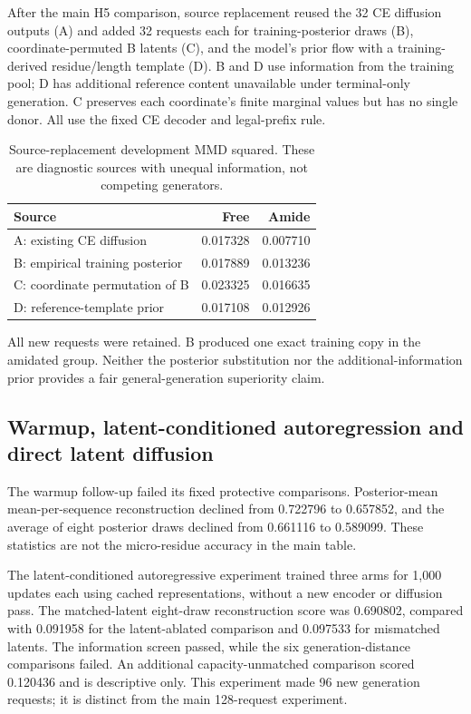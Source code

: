 \documentclass[12pt,a4paper]{article}
\begin{document}
After the main H5 comparison, source replacement reused the 32 CE diffusion outputs (A) and added 32 requests each for training-posterior draws (B), coordinate-permuted B latents (C), and the model's prior flow with a training-derived residue/length template (D). B and D use information from the training pool; D has additional reference content unavailable under terminal-only generation. C preserves each coordinate's finite marginal values but has no single donor. All use the fixed CE decoder and legal-prefix rule.
\begin{table}[htbp]\centering\singlespacing\small
\caption{Source-replacement development MMD squared. These are diagnostic sources with unequal information, not competing generators.}
\begin{tabular}{lrr}\toprule Source & Free & Amide\\\midrule
A: existing CE diffusion & 0.017328 & 0.007710\\
B: empirical training posterior & 0.017889 & 0.013236\\
C: coordinate permutation of B & 0.023325 & 0.016635\\
D: reference-template prior & 0.017108 & 0.012926\\\bottomrule
\end{tabular}\end{table}
All new requests were retained. B produced one exact training copy in the amidated group. Neither the posterior substitution nor the additional-information prior provides a fair general-generation superiority claim.

\subsection{Warmup, latent-conditioned autoregression and direct latent diffusion}
The warmup follow-up failed its fixed protective comparisons. Posterior-mean mean-per-sequence reconstruction declined from 0.722796 to 0.657852, and the average of eight posterior draws declined from 0.661116 to 0.589099. These statistics are not the micro-residue accuracy in the main table.

The latent-conditioned autoregressive experiment trained three arms for 1,000 updates each using cached representations, without a new encoder or diffusion pass. The matched-latent eight-draw reconstruction score was 0.690802, compared with 0.091958 for the latent-ablated comparison and 0.097533 for mismatched latents. The information screen passed, while the six generation-distance comparisons failed. An additional capacity-unmatched comparison scored 0.120436 and is descriptive only. This experiment made 96 new generation requests; it is distinct from the main 128-request experiment.
\end{document}
